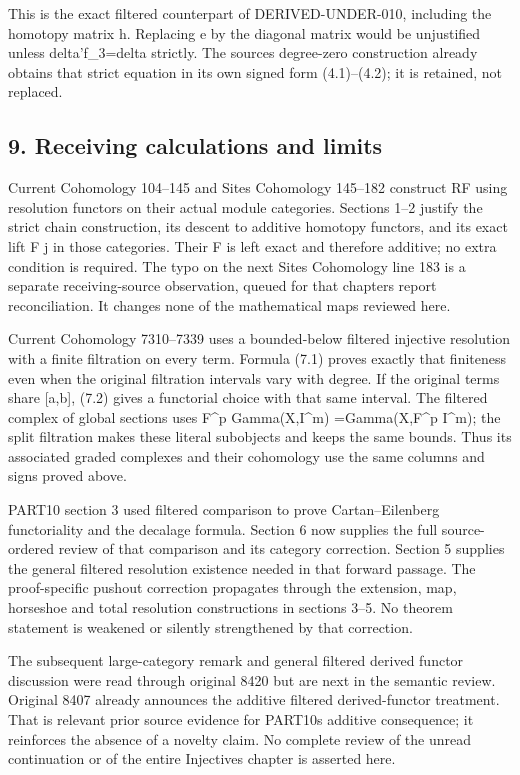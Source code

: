 This is the exact filtered counterpart of DERIVED-UNDER-010,\allowbreak{} including the homotopy matrix h. Replacing e by the diagonal matrix would be unjustified unless delta'f\_\allowbreak{}3\allowbreak{}=delta strictly. The source\textquotesingle s degree-zero construction already obtains that strict equation in its own signed form (4.1)\allowbreak{}–\allowbreak{}(4.2)\allowbreak{}; it is retained,\allowbreak{} not replaced.

\subsection{9. Receiving calculations and limits}\label{proofs-7589-8350-receiving-calculations-and-limits}

Current Cohomology 104–\allowbreak{}145 and Sites Cohomology 145–\allowbreak{}182 construct RF using resolution functors on their actual module categories. Sections 1–\allowbreak{}2 justify the strict chain construction,\allowbreak{} its descent to additive homotopy functors,\allowbreak{} and its exact lift F j\textquotesingle{} in those categories. Their F is left exact and therefore additive; no extra condition is required. The typo on the next Sites Cohomology line 183 is a separate receiving-source observation,\allowbreak{} queued for that chapter\textquotesingle s report reconciliation. It changes none of the mathematical maps reviewed here.

Current Cohomology 7310–\allowbreak{}7339 uses a bounded-below filtered injective resolution with a finite filtration on every term. Formula (7.1)\allowbreak{} proves exactly that finiteness even when the original filtration intervals vary with degree. If the original terms share [a,\allowbreak{}b]\allowbreak{},\allowbreak{} (7.2)\allowbreak{} gives a functorial choice with that same interval. The filtered complex of global sections uses F\^{}p Gamma(X,\allowbreak{}I\textasciicircum{}m)\allowbreak{} \allowbreak{}=Gamma(X,\allowbreak{}F\textasciicircum{}p I\textasciicircum{}m)\allowbreak{}; the split filtration makes these literal subobjects and keeps the same bounds. Thus its associated graded complexes and their cohomology use the same columns and signs proved above.

PART10 section 3 used filtered comparison to prove Cartan–\allowbreak{}Eilenberg functoriality and the decalage formula. Section 6 now supplies the full source-ordered review of that comparison and its category correction. Section 5 supplies the general filtered resolution existence needed in that forward passage. The proof-specific pushout correction propagates through the extension,\allowbreak{} map,\allowbreak{} horseshoe and total resolution constructions in sections 3–\allowbreak{}5. No theorem statement is weakened or silently strengthened by that correction.

The subsequent large-category remark and general filtered derived functor discussion were read through original 8420 but are next in the semantic review. Original 8407 already announces the additive filtered derived-functor treatment. That is relevant prior source evidence for PART10\textquotesingle s additive consequence; it reinforces the absence of a novelty claim. No complete review of the unread continuation or of the entire Injectives chapter is asserted here.
